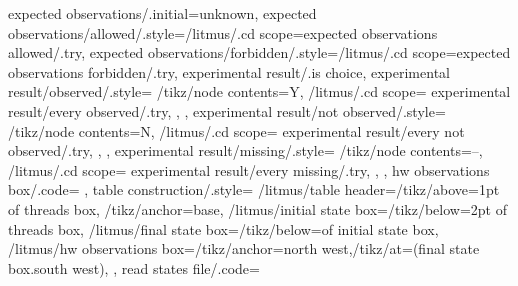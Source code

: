 {{  expected observations/.initial=unknown,
  expected observations/allowed/.style={/litmus/.cd scope={expected observations allowed/.try}},
  expected observations/forbidden/.style={/litmus/.cd scope={expected observations forbidden/.try}},
  experimental result/.is choice,
  experimental result/observed/.style={
    /tikz/node contents=Y,
    /litmus/.cd scope={
      experimental result/every observed/.try,
    },
  },
  experimental result/not observed/.style={
    /tikz/node contents=N,
    /litmus/.cd scope={
      experimental result/every not observed/.try,
    },
  },
  experimental result/missing/.style={
    /tikz/node contents={--},
    /litmus/.cd scope={
      experimental result/every missing/.try,
    },
  },
  hw observations box/.code={
  },
  table construction/.style={
    /litmus/table header={/tikz/above=1pt of threads box, /tikz/anchor=base},
    /litmus/initial state box={/tikz/below=2pt of threads box},
    /litmus/final state box={/tikz/below=of initial state box},
    /litmus/hw observations box={/tikz/anchor=north west,/tikz/at=(final state box.south west)},
  },
  read states file/.code={%
}}}
